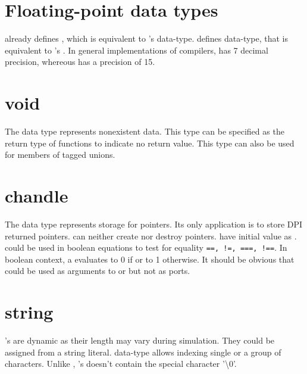 \section{Floating-point data types}
\lvlog already defines \kwreal, which is equivalent to \lc's
 data-type. \lsvlog defines \kwshortreal data-type, that is
equivalent to \lc's . In general implementations of \lc
compilers,  has 7 decimal precision, whereous 
has a precision of 15.

\section{void}
The \kwvoid data type represents nonexistent data. This type can be
specified as the return type of functions to indicate no return
value. This type can also be used for members of tagged unions.

\section{chandle}
The \kwchandle data type represents storage for pointers. Its only
application is to store DPI returned pointers. \lsvlog can neither
create nor destroy \lc pointers. \kwchandle have initial value as
\kwnull. \kwchandle could be used in boolean equations to test for
equality \texttt{==, !=, ===, !==}. In boolean context, a \kwchandle
evaluates to 0 if \kwnull or to 1 otherwise. It should be obvious that
\kwchandle could be used as arguments to \kwfunction or \kwtask but
not as ports.

\section{string}
\lsvlog's \kwstring are dynamic as their length may vary during
simulation. They could be assigned from a string literal. \kwstring
data-type allows indexing single or a group of characters. Unlike \lc,
\lsvlog's \kwstring doesn't contain the special character
'\textbackslash{}0'.
